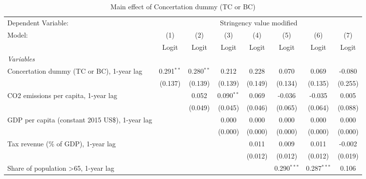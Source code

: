
\begin{table}[htbp]
   \caption{Main effect of Concertation dummy (TC or BC)}
   \centering
   \begin{tabular}{lccccccc}
      \toprule
      Dependent Variable: & \multicolumn{7}{c}{Stringency value modified}\\
      Model:                                                & (1)          & (2)          & (3)          & (4)     & (5)           & (6)           & (7)\\  
                                                            &  Logit       & Logit        & Logit        & Logit   & Logit         & Logit         & Logit\\  
      \midrule
      \emph{Variables}\\
      Concertation dummy (TC or BC), 1-year lag             & 0.291$^{**}$ & 0.280$^{**}$ & 0.212        & 0.228   & 0.070         & 0.069         & -0.080\\   
                                                            & (0.137)      & (0.139)      & (0.139)      & (0.149) & (0.134)       & (0.135)       & (0.255)\\   
      CO2 emissions per capita, 1-year lag                  &              & 0.052        & 0.090$^{**}$ & 0.069   & -0.036        & -0.035        & 0.005\\   
                                                            &              & (0.049)      & (0.045)      & (0.046) & (0.065)       & (0.064)       & (0.088)\\   
      GDP per capita (constant 2015 US\$), 1-year lag       &              &              & 0.000        & 0.000   & 0.000         & 0.000         & 0.000\\   
                                                            &              &              & (0.000)      & (0.000) & (0.000)       & (0.000)       & (0.000)\\   
      Tax revenue (\% of GDP), 1-year lag                   &              &              &              & 0.011   & 0.009         & 0.011         & -0.002\\   
                                                            &              &              &              & (0.012) & (0.012)       & (0.012)       & (0.019)\\   
      Share of population >65, 1-year lag                   &              &              &              &         & 0.290$^{***}$ & 0.287$^{***}$ & 0.106\\   

\end{tabular}
\end{table}
